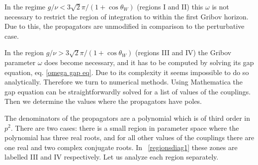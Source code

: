 In the regime $g/\nu<3\sqrt2\pi/(1+\cos\theta_W)$ (regions I and II) this $\omega$ is not necessary to restrict the region of integration to within the first Gribov horizon. Due to this, the propagators are unmodified in comparison to the perturbative case.

In the region $g/\nu>3\sqrt2\pi/(1+\cos\theta_W)$ (regions III and IV) the Gribov parameter $\omega$ does become necessary, and it has to be computed by solving its gap equation, eq. \eqref{omega gap eq}. Due to its complexity it seems impossible to do so analytically. Therefore we turn to numerical methods. Using Mathematica the gap equation can be straightforwardly solved for a list of values of the couplings. Then we determine the values where the propagators have poles. 

The denominators of the propagators are a polynomial which is of third order in $p^2$. There are two cases: there is a small region in parameter space where the polynomial has three real roots, and for all other values of the couplings there are one real and two complex conjugate roots. In \figurename\ \ref{regionsdiag1} these zones are labelled III and IV respectively. Let us analyze each region separately.



